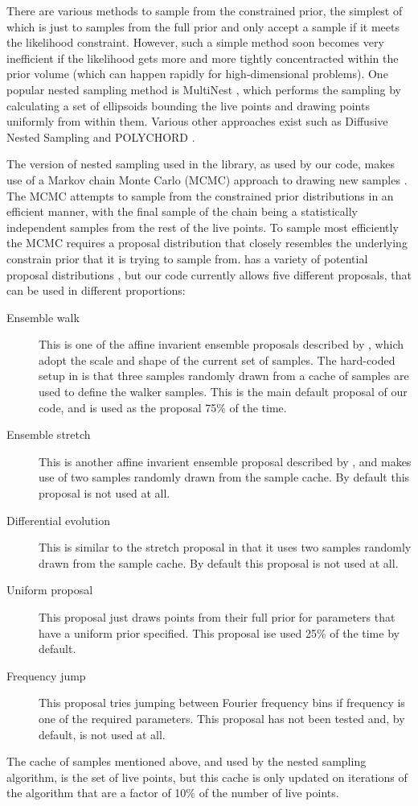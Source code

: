 There are various methods to sample from the constrained prior, the simplest of which is just to samples from the full
prior and only accept a sample if it meets the likelihood constraint. However, such a simple method soon becomes very
inefficient if the likelihood gets more and more tightly concentracted within the prior volume (which can happen rapidly
for high-dimensional problems). One popular nested sampling method is MultiNest \citep{2009MNRAS.398.1601F}, which performs
the sampling by calculating a set of ellipsoids bounding the live points and drawing points uniformly from within them.
Various other approaches exist such as Diffusive Nested Sampling \citet{Brewer2011,2016arXiv160603757B} and POLYCHORD \citet{2015MNRAS.450L..61H}.

The version of nested sampling used in the \lalinf library, as used by our code, makes use of a Markov chain Monte Carlo (MCMC) approach to
drawing new samples \citep{Veitch:2010}. The MCMC attempts to sample from the constrained prior distributions in an efficient manner, with
the final sample of the chain being a statistically independent samples from the rest of the live points. To sample most efficiently
the MCMC requires a proposal distribution that closely resembles the underlying constrain prior that it is trying to sample from.
\lalinf has a variety of potential proposal distributions \citep{2015PhRvD..91d2003V}, but our code currently allows five different
proposals, that can be used in different proportions:
\begin{description}
 \item[Ensemble walk] This is one of the affine invarient ensemble proposals described by \citet{GoodmanWeare}, which adopt the
 scale and shape of the current set of samples. The hard-coded setup in \lalinf is that three samples randomly drawn from a cache
 of samples are used to define the walker samples. This is the main default proposal of our code, and is used as the proposal
 75\% of the time.
 \item[Ensemble stretch] This is another affine invarient ensemble proposal described by \citet{GoodmanWeare}, and makes use of
 two samples randomly drawn from the sample cache. By default this proposal is not used at all.
 \item[Differential evolution] This is similar to the stretch proposal in that it uses two samples randomly drawn from the sample
 cache. By default this proposal is not used at all.
 \item[Uniform proposal] This proposal just draws points from their full prior for parameters that have a uniform prior specified.
 This proposal ise used 25\% of the time by default.
 \item[Frequency jump] This proposal tries jumping between Fourier frequency bins if frequency is one of the required parameters.
 This proposal has not been tested and, by default, is not used at all.
\end{description}
The cache of samples mentioned above, and used by the nested sampling algorithm, is the set of live points, but this cache is
only updated on iterations of the algorithm that are a factor of 10\% of the number of live points.

